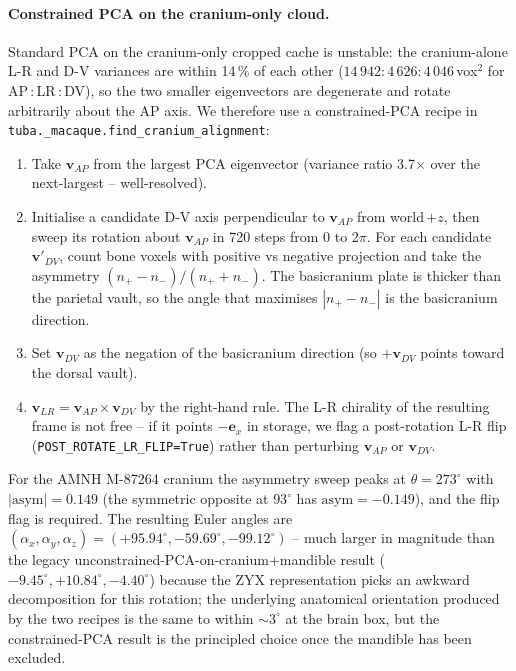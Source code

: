 \documentclass{compactarticle}
\begin{document}
\paragraph{Constrained PCA on the cranium-only cloud.}
Standard PCA on the cranium-only cropped cache is unstable: the
cranium-alone L-R and D-V variances are within 14\,\% of each other
($14\,942 : 4\,626 : 4\,046$\,vox$^2$ for AP\,:\,LR\,:\,DV), so the
two smaller eigenvectors are degenerate and rotate arbitrarily about
the AP axis. We therefore use a constrained-PCA recipe in
\texttt{tuba.\_macaque.\allowbreak find\_cranium\_alignment}:
\begin{enumerate}[leftmargin=*]
\setlength\itemsep{0pt}
  \item Take $\mathbf{v}_{AP}$ from the largest PCA eigenvector
        (variance ratio 3.7$\times$ over the next-largest -- well-resolved).
  \item Initialise a candidate D-V axis perpendicular to
        $\mathbf{v}_{AP}$ from world\,$+z$, then sweep its rotation
        about $\mathbf{v}_{AP}$ in 720 steps from 0 to 2$\pi$. For
        each candidate $\mathbf{v}'_{DV}$, count bone voxels with
        positive vs negative projection and take the asymmetry
        $(n_{+}{-}n_{-})/(n_{+}{+}n_{-})$. The basicranium plate is
        thicker than the parietal vault, so the angle that maximises
        $|n_{+}{-}n_{-}|$ is the basicranium direction.
  \item Set $\mathbf{v}_{DV}$ as the negation of the basicranium
        direction (so $+\mathbf{v}_{DV}$ points toward the dorsal vault).
  \item $\mathbf{v}_{LR}=\mathbf{v}_{AP}\times \mathbf{v}_{DV}$ by the
        right-hand rule. The L-R chirality of the resulting frame is
        not free -- if it points $-\mathbf{e}_x$ in storage, we flag a
        post-rotation L-R flip (\texttt{POST\_ROTATE\_LR\_FLIP=True})
        rather than perturbing $\mathbf{v}_{AP}$ or $\mathbf{v}_{DV}$.
\end{enumerate}
For the AMNH M-87264 cranium the asymmetry sweep peaks at
$\theta = 273^\circ$ with $|\mathrm{asym}| = 0.149$ (the symmetric
opposite at $93^\circ$ has $\mathrm{asym} = -0.149$), and the flip
flag is required. The resulting Euler angles are
$(\alpha_x, \alpha_y, \alpha_z) = (+95.94^\circ, -59.69^\circ,
-99.12^\circ)$ -- much larger in magnitude than the legacy
unconstrained-PCA-on-cranium+mandible result ($-9.45^\circ,
+10.84^\circ, -4.40^\circ$) because the ZYX representation picks an
awkward decomposition for this rotation; the underlying anatomical
orientation produced by the two recipes is the same to within
$\sim$$3^\circ$ at the brain box, but the constrained-PCA result is
the principled choice once the mandible has been excluded.
\end{document}

